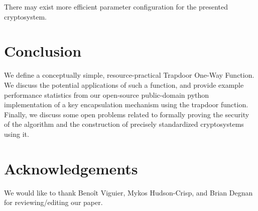 \documentclass[preprint]{iacrtrans}
\begin{document}
There may exist more efficient parameter configuration for the presented cryptosystem. 

\section{Conclusion}
We define a conceptually simple, resource-practical Trapdoor One-Way Function. We discuss the potential applications of such a function, and provide example performance statistics from our open-source public-domain python implementation of a key encapsulation mechanism using the trapdoor function. Finally, we discuss some open problems related to formally proving the security of the algorithm and the construction of precisely standardized cryptosystems using it.


\section*{Acknowledgements}

We would like to thank Beno\^it Viguier, Mykos Hudson-Crisp, and Brian Degnan for reviewing/editing our paper.
\end{document}
